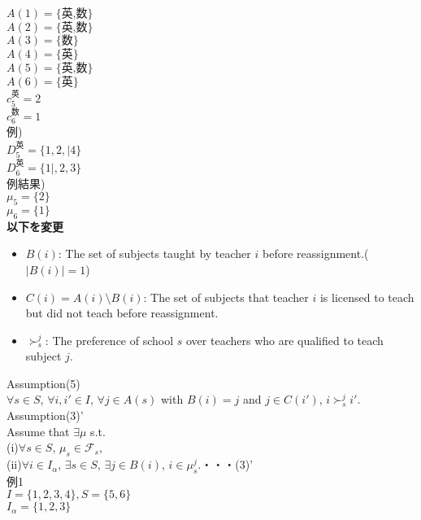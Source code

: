 \documentclass[a4j,10pt]{jsarticle}
\theoremstyle{definition}
\theoremstyle{remark}
\theoremstyle{plain}
\begin{document}
\begin{tcolorbox}[enhanced,breakable=true]
$A(1) = \{\text{英,数}\}$\\
$A(2) = \{\text{英,数}\}$\\
$A(3) = \{\text{数}\}$\\
$A(4) = \{\text{英}\}$\\


$A(5) = \{\text{英,数}\}$\\
$A(6) = \{\text{英}\}$\\

$c_5^{\text{英}} = 2$\\
$c_6^{\text{数}} = 1$\\

例)\\
$D_5^{\text{英}} = \{1,2,|4\}$\\
$D_6^{\text{英}} = \{1|,2,3\}$\\

例結果)\\
$\mu_5 = \{2\}$\\
$\mu_6 = \{1\}$\\



\textbf{以下を変更}
\begin{itemize}
  \item $B(i)$: The set of subjects taught by teacher $i$ before reassignment.($|B(i)| = 1$)
  \item $C(i) = A(i) \setminus B(i)$: The set of subjects that teacher $i$ is licensed to teach but did not teach before reassignment.
  \item $\succ_s^j$: The preference of school $s$ over teachers who are qualified to teach subject $j$.
\end{itemize}

Assumption(5)\\
$\forall s \in S$, $\forall i, i' \in I$, $\forall j \in A(s)$ with $B(i) = j$ and $j \in C(i')$, $i \succ_{s}^j i'$.\\

Assumption(3)'\\
  Assume that $\exists \mu $ s.t. \\
    (i)$\forall s \in S$, $\mu_s \in \mathcal{F}_s$,\\
    (ii)$\forall i \in I_\alpha$, $\exists s \in S$, $\exists j \in B(i)$, $i \in \mu_s^j$.・・・(3)'\\



例1\\
$I = \{1,2,3,4\}, S = \{5,6\}$\\
$I_\alpha = \{1,2,3\}$\\


\end{tcolorbox}
\end{document}
